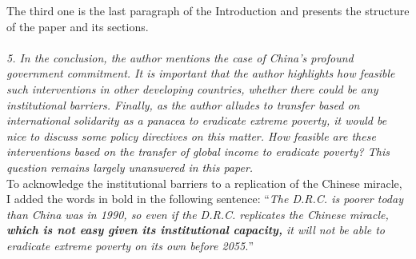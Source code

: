 \documentclass[12pt,english]{article}
\begin{document}
The third one is the last paragraph of the Introduction and presents the structure of the paper and its sections.
~\\ ~\\

\textit{5. In the conclusion, the author mentions the case of China's profound government commitment. It is important that the author highlights how feasible such interventions in other developing countries, whether there could be any institutional barriers. Finally, as the author alludes to transfer based on international solidarity as a panacea to eradicate extreme poverty, it would be nice to discuss some policy directives on this matter. How feasible are these interventions based on the transfer of global income to eradicate poverty? This question remains largely unanswered in this paper.}~\\

To acknowledge the institutional barriers to a replication of the Chinese miracle, I added the words in bold in the following sentence: ``\textit{The D.R.C. is poorer today than China was in 1990, 
so even if the D.R.C. replicates the Chinese miracle, \textbf{which is not easy given its institutional capacity,} it will not be able to eradicate extreme poverty on its own before 2055.}''
\end{document}
